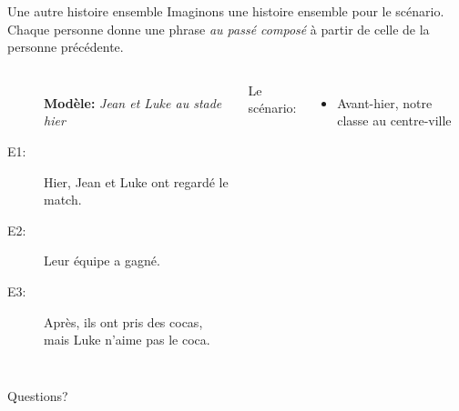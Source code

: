\documentclass{beamer}
\begin{document}
  \begin{frame}{Une autre histoire ensemble}
    Imaginons une histoire ensemble pour le scénario.
    Chaque personne donne une phrase \emph{au passé composé} à partir de celle de la personne précédente. \\
    \begin{columns}
        \small
        \begin{description}
          \item[] \textbf{Modèle:} \emph{Jean et Luke au stade hier}
          \item[E1:] Hier, Jean et Luke ont regardé le match.
          \item[E2:] Leur équipe a gagné.
          \item[E3:] Après, ils ont pris des cocas, mais Luke n'aime pas le coca.
        \end{description}
        \alert{Le scénario:}
        \begin{itemize}
          \item Avant-hier, notre classe au centre-ville
        \end{itemize}
    \end{columns}
  \end{frame}

  \begin{frame}{}
    \begin{center}
      \Large Questions?
    \end{center}
  \end{frame}
\end{document}
